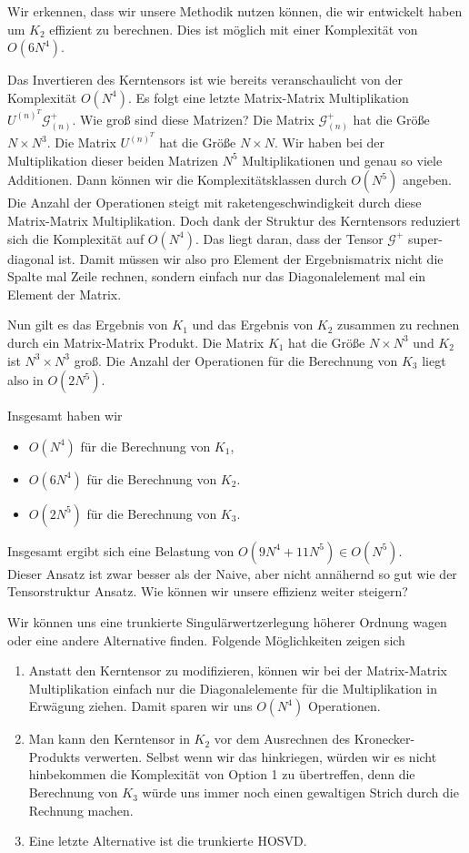 Wir erkennen, dass wir unsere Methodik nutzen können, die wir entwickelt haben um $K_2$ effizient zu berechnen. Dies ist möglich mit einer Komplexität von $O(6N^4)$.

Das Invertieren des Kerntensors ist wie bereits veranschaulicht von der Komplexität $O(N^4)$.
Es folgt eine letzte Matrix-Matrix Multiplikation $U^{ (n) ^{T} }  \mathscr{G}^{+}_{(n)}$. Wie groß sind diese Matrizen? Die Matrix $ \mathscr{G}^{+}_{(n)}$ hat die Größe $N \times N^3$. Die Matrix  $U^{ (n) ^{T} }$ hat die Größe $N \times N$.  Wir haben bei der Multiplikation dieser beiden Matrizen $N^5$ Multiplikationen und genau so viele Additionen. Dann können wir die Komplexitätsklassen durch $O(N^5)$ angeben. Die Anzahl der Operationen steigt mit raketengeschwindigkeit durch diese Matrix-Matrix Multiplikation. Doch dank der Struktur des Kerntensors reduziert sich die Komplexität auf $O(N^4)$. Das liegt daran, dass der Tensor $ \mathscr{G}^{+}$ super-diagonal ist. Damit müssen wir also pro Element der Ergebnismatrix nicht die Spalte mal Zeile rechnen, sondern einfach nur das Diagonalelement mal ein Element der Matrix. 

Nun gilt es das Ergebnis von $K_1$ und das Ergebnis von $K_2$ zusammen zu rechnen durch ein Matrix-Matrix Produkt. Die Matrix $K_1$ hat die Größe $N \times N^3$ und $K_2$ ist $N^3 \times N^3$ groß. 
Die Anzahl der Operationen für die Berechnung von $K_3$ liegt also in $O(2N^{5})$.

Insgesamt haben wir
\begin{itemize}
\item $O(N^4)$ für die Berechnung von $K_1$,
\item $O(6N^4)$ für die Berechnung von $K_2$.
\item $O(2N^{5})$ für die Berechnung von $K_3$.
\end{itemize}

Insgesamt ergibt sich eine Belastung von $O(9N^4+11N^{5}) \in O(N^5)$. \\ Dieser Ansatz ist zwar besser als der Naive, aber nicht annähernd so gut wie der Tensorstruktur Ansatz. Wie können wir unsere effizienz weiter steigern?

Wir können uns eine trunkierte Singulärwertzerlegung höherer Ordnung  wagen oder eine andere Alternative finden. Folgende Möglichkeiten zeigen sich

\begin{enumerate}
\item Anstatt den Kerntensor zu modifizieren, können wir bei der Matrix-Matrix Multiplikation einfach nur die Diagonalelemente für die Multiplikation in Erwägung ziehen. Damit sparen wir uns $O(N^4)$ Operationen.

\item Man kann den Kerntensor in $K_2$ vor dem Ausrechnen des Kronecker-Produkts verwerten. Selbst wenn wir das hinkriegen, würden wir es nicht hinbekommen die Komplexität von Option 1 zu übertreffen, denn die Berechnung von $K_3$ würde uns immer noch einen gewaltigen Strich durch die Rechnung machen.

\item Eine letzte Alternative ist die trunkierte HOSVD.

\end{enumerate}

